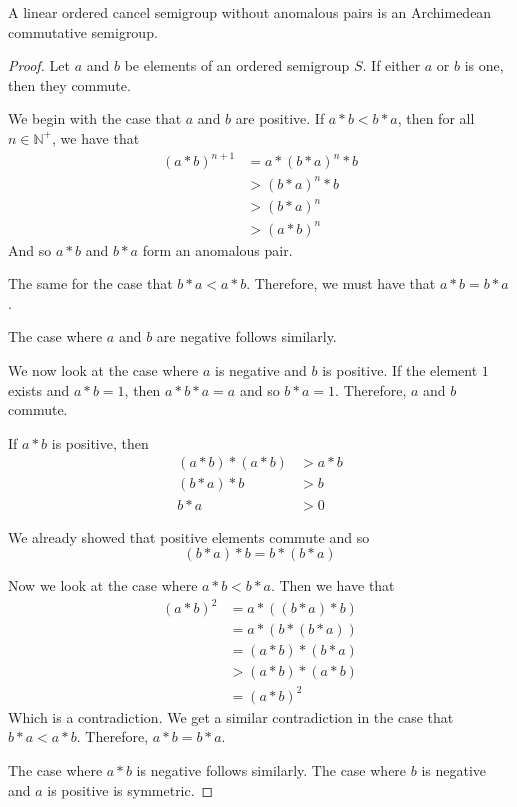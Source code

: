 \begin{theorem}\label{non_anomalous_comm_and_arch}\leanok
{}
A linear ordered cancel semigroup without anomalous pairs is an Archimedean commutative semigroup.
\end{theorem}
\begin{proof}\leanok
Let $a$ and $b$ be elements of an ordered semigroup $S$.
If either $a$ or $b$ is one, then they commute.

We begin with the case that $a$ and $b$ are positive.
If $a * b < b * a$, then for all $n\in \mathbb{N}^+$, we have that
\begin{align*}
(a*b)^{n+1} &= a * (b*a)^n * b \\
&> (b*a)^n * b \\
&> (b*a)^n \\
&> (a*b)^n
\end{align*}
And so $a*b$ and $b*a$ form an anomalous pair.

The same for the case that $b * a < a * b$.
Therefore, we must have that $a*b = b*a$.

The case where $a$ and $b$ are negative follows similarly.

We now look at the case where $a$ is negative and $b$ is positive.
If the element $1$ exists and $a*b = 1$, then $a * b * a = a$ and so $b*a = 1$.
Therefore, $a$ and $b$ commute.

If $a * b$ is positive, then
\begin{align*}
(a*b) * (a*b) &> a * b \\
(b * a) * b &> b \\
b * a &> 0
\end{align*}

We already showed that positive elements commute and so
\[ (b*a) * b = b * (b * a)\]

Now we look at the case where $a*b < b*a$.
Then we have that
\begin{align*}
(a * b)^2 &= a * ((b*a) * b) \\
&= a * (b * (b * a)) \\
&= (a * b) * (b * a) \\
&> (a * b) * (a * b) \\
&= (a * b)^2
\end{align*}
Which is a contradiction.
We get a similar contradiction in the case that $b*a < a*b$.
Therefore, $a*b = b*a$.

The case where $a*b$ is negative follows similarly.
The case where $b$ is negative and $a$ is positive is symmetric.
\end{proof}

